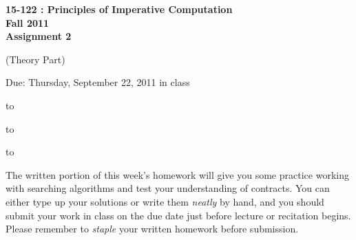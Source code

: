 \documentclass[12pt]{exam}
\begin{document}
\addpoints
\begin{center}
\textbf{\large{15-122 : Principles of Imperative Computation
 \\ \vspace{0.2in} Fall 2011
\\  \vspace{0.2in} Assignment 2
}}

 \vspace{0.2in}
 (\large{Theory Part})

 \vspace{0.2in}

 \large{Due: Thursday, September 22, 2011 in class}
\end{center}

\vspace{0.5in}

\hbox to \textwidth{Name:\enspace\hrulefill}


\vspace{0.2in}

\hbox to \textwidth{Andrew ID:\enspace\hrulefill}

\vspace{0.2in}

\hbox to \textwidth{Recitation:\enspace\hrulefill}



\vspace{0.5in}

\noindent The written portion of this week's homework will give you some practice
working with searching algorithms and test
your understanding of contracts.
You can either type up your solutions or write them
\textit{neatly} by hand, and you should submit your work in class on the
due date just before lecture or recitation begins. Please remember to \textit{staple}
your written homework before submission.
\vspace{0.2in}

\begin{center}
\gradetable[v][questions]
\end{center}
\end{document}
